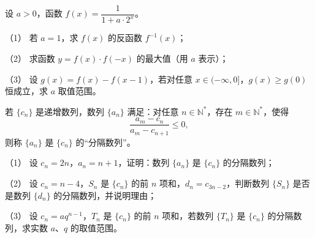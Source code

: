 \begin{question}
设 $a>0$，函数 $f(x)=\dfrac{1}{1+a\cdot2^x}$。

（1） 若 $a=1$，求 $f(x)$ 的反函数 $f^{-1}(x)$；

（2） 求函数 $y=f(x)\cdot f(-x)$ 的最大值（用 $a$ 表示）；

（3） 设 $g(x)=f(x)-f(x-1)$，若对任意 $x\in(-\infty,0]$，$g(x)\geq g(0)$ 恒成立，求 $a$ 取值范围。

\end{question}
\begin{question}
若 $\{c_n\}$ 是递增数列，数列 $\{a_n\}$ 满足：对任意 $n\in\mathbb N^*$，存在 $m\in\mathbb N^*$，使得
\nopagebreak[4]
\[
\frac{a_m-c_n}{a_m-c_{n+1}}\leq0,
\]
则称 $\{a_n\}$ 是 $\{c_n\}$ 的“分隔数列”。

（1） 设 $c_n=2n$，$a_n=n+1$，证明：数列 $\{a_n\}$ 是 $\{c_n\}$ 的分隔数列；

（2） 设 $c_n=n-4$，$S_n$ 是 $\{c_n\}$ 的前 $n$ 项和，$d_n=c_{3n-2}$，判断数列 $\{S_n\}$ 是否是数列 $\{d_n\}$ 的分隔数列，并说明理由；

（3） 设 $c_n=aq^{n-1}$，$T_n$ 是 $\{c_n\}$ 的前 $n$ 项和，若数列 $\{T_n\}$ 是 $\{c_n\}$ 的分隔数列，求实数 $a\text{、}q$ 的取值范围。

\end{question}